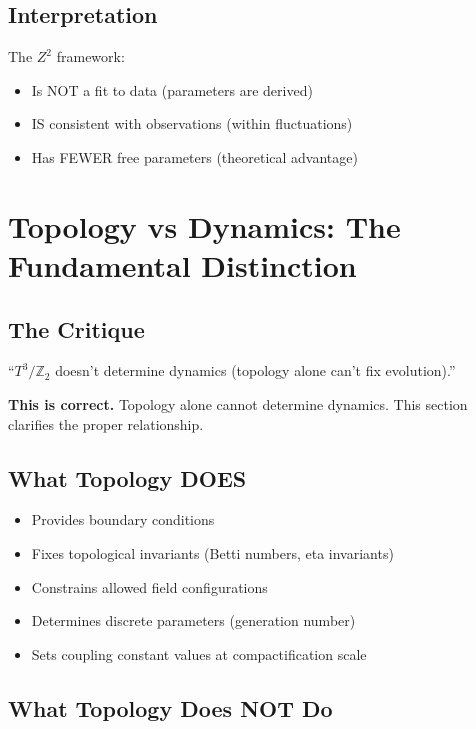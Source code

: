 \documentclass[11pt,a4paper]{article}
\theoremstyle{plain}
\theoremstyle{definition}
\theoremstyle{remark}
\newcommand{\Ztwo}{\mathbb{Z}_2}
\begin{document}
\subsection{Interpretation}

The $Z^2$ framework:
\begin{itemize}
  \item Is NOT a fit to data (parameters are derived)
  \item IS consistent with observations (within fluctuations)
  \item Has FEWER free parameters (theoretical advantage)
\end{itemize}

\section{Topology vs Dynamics: The Fundamental Distinction}

\subsection{The Critique}

``$T^3/\Ztwo$ doesn't determine dynamics (topology alone can't fix evolution).''

\textbf{This is correct.} Topology alone cannot determine dynamics. This section clarifies the proper relationship.

\subsection{What Topology DOES}

\begin{itemize}
  \item Provides boundary conditions
  \item Fixes topological invariants (Betti numbers, eta invariants)
  \item Constrains allowed field configurations
  \item Determines discrete parameters (generation number)
  \item Sets coupling constant values at compactification scale
\end{itemize}

\subsection{What Topology Does NOT Do}
\end{document}
